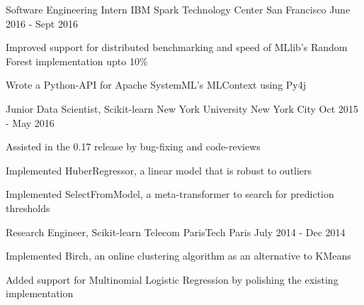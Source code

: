 \begin{cventries}
  \cventry
    {Software Engineering Intern}
    {IBM Spark Technology Center}
    {San Francisco}
    {June 2016 - Sept 2016}
    {
      \begin{cvitems}
        \item {Improved support for distributed benchmarking and speed of MLlib's Random Forest implementation upto 10\%}
        \item {Wrote a Python-API for Apache SystemML's MLContext using Py4j}
      \end{cvitems}
   }
   \cventry
    {Junior Data Scientist, Scikit-learn}
    {New York University}
    {New York City}
    {Oct 2015 - May 2016}
    {
      \begin{cvitems}
        \item {Assisted in the 0.17 release by bug-fixing and code-reviews}
        \item {Implemented HuberRegressor, a linear model that is robust to outliers}
        \item {Implemented SelectFromModel, a meta-transformer to search for prediction thresholds}
      \end{cvitems}
    }
   \cventry
    {Research Engineer, Scikit-learn}
    {Telecom ParisTech}
    {Paris}
    {July 2014 - Dec 2014}
    {
      \begin{cvitems}
        \item {Implemented Birch, an online clustering algorithm as an alternative to KMeans}
        \item {Added support for Multinomial Logistic Regression by polishing the existing implementation}
      \end{cvitems}
    }
\end{cventries}
